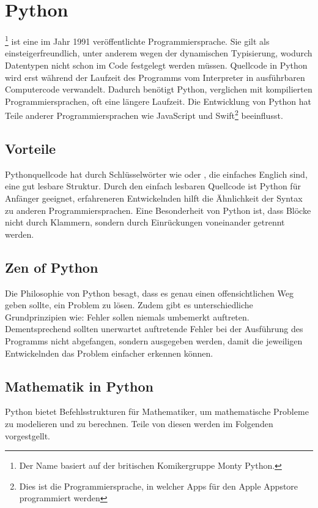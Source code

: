 \section{Python}
\footnote{Der Name basiert auf der britischen Komikergruppe Monty Python.} ist eine im Jahr 1991 \cite[s. Literaturverzeichnis]{jahreszahl} veröffentlichte Programmiersprache. Sie gilt als einsteigerfreundlich, unter anderem wegen der dynamischen Typisierung, wodurch Datentypen nicht schon im Code festgelegt werden müssen. Quellcode in Python wird erst während der Laufzeit des Programms vom Interpreter in ausführbaren Computercode verwandelt. Dadurch benötigt Python, verglichen mit kompilierten Programmiersprachen, oft eine längere Laufzeit. Die Entwicklung von Python hat Teile anderer Programmiersprachen wie JavaScript und Swift\footnote{Dies ist die Programmiersprache, in welcher Apps für den Apple Appstore programmiert werden} beeinflusst.

\subsection{Vorteile}
Pythonquellcode hat durch Schlüsselwörter wie  oder , die einfaches Englich sind, eine gut lesbare Struktur.  Durch den einfach lesbaren Quellcode ist Python für Anfänger geeignet, erfahreneren Entwickelnden hilft die Ähnlichkeit der Syntax zu anderen Programmiersprachen. Eine Besonderheit von Python ist, dass Blöcke nicht durch Klammern, sondern durch Einrückungen voneinander getrennt werden.

\subsection{Zen of Python}
Die Philosophie von Python besagt, dass es genau einen offensichtlichen Weg geben sollte, ein Problem zu lösen. Zudem gibt es unterschiedliche Grundprinzipien wie: \glqq Fehler sollen niemals umbemerkt auftreten\grqq . Dementsprechend sollten unerwartet auftretende Fehler bei der Ausführung des Programms nicht abgefangen, sondern ausgegeben werden, damit die jeweiligen Entwickelnden das Problem einfacher erkennen können.

\subsection{Mathematik in Python}
Python bietet Befehlsstrukturen für Mathematiker, um mathematische Probleme zu modelieren und zu berechnen. Teile von diesen werden im Folgenden vorgestgellt.

